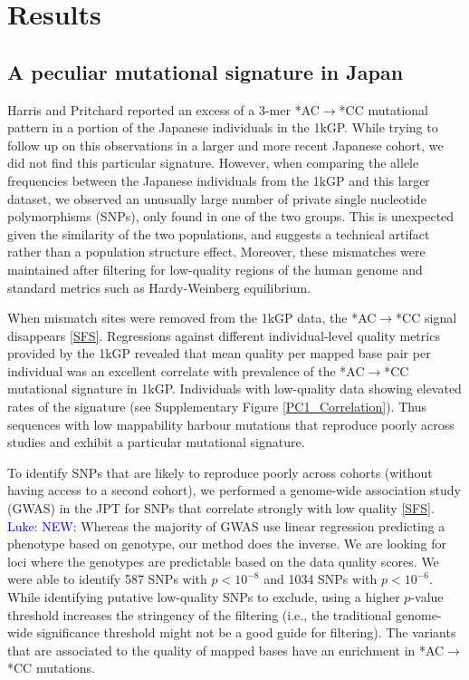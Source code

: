 \documentclass[9pt,lineno]{elife}
\newcommand{\luke}[1]{\textcolor{blue}{Luke: #1}}
\begin{document}
			\section{Results}
	\subsection{A peculiar mutational signature in Japan}			
	
Harris and Pritchard reported an excess of a 3-mer *AC${\rightarrow}$*CC mutational pattern in a portion of the Japanese individuals in the 1kGP.\cite{Harris2015a}
While trying to follow up on this observations in a larger and more recent Japanese cohort, we did not find this particular signature.
However, when comparing the allele frequencies between the Japanese individuals from the 1kGP and this larger dataset, we observed an unusually large number of private single nucleotide polymorphisms (SNPs), only found in one of the two groups.
This is unexpected given the similarity of the two populations, and suggests a technical artifact rather than a population structure effect. 
Moreover, these mismatches were maintained after filtering for low-quality regions of the human genome and standard metrics such as Hardy-Weinberg equilibrium.

When mismatch sites were removed from the 1kGP data, the  *AC${\rightarrow}$*CC signal disappears \ref{SFS}.
Regressions against different individual-level quality metrics provided by the 1kGP revealed that mean quality per mapped base pair per individual was an excellent correlate with prevalence of the  *AC${\rightarrow}$*CC mutational signature in 1kGP. 
Individuals with low-quality data showing elevated rates of the signature (see Supplementary Figure \ref{PC1_Correlation}).
Thus sequences with low mappability harbour mutations that reproduce poorly across studies and exhibit a particular mutational signature. 

To identify SNPs that are likely to reproduce poorly across cohorts (without having access to a second cohort), we performed a genome-wide association study (GWAS) in the JPT for SNPs that correlate strongly with low quality \ref{SFS}.
\luke{NEW:} 
Whereas the majority of GWAS use linear regression predicting a phenotype based on genotype, our method does the inverse.
We are looking for loci where the genotypes are predictable based on the data quality scores.
We were able to identify 587 SNPs with $p < 10^{-8}$ and 1034 SNPs with $ p < 10^{-6}$.
While identifying putative low-quality SNPs to exclude, using a higher $p$-value threshold increases the stringency of the filtering (i.e., the traditional genome-wide significance threshold might not be a good guide for filtering).  
The variants that are associated to the quality of mapped bases have an enrichment in *AC${\rightarrow}$*CC mutations. 
\end{document}

